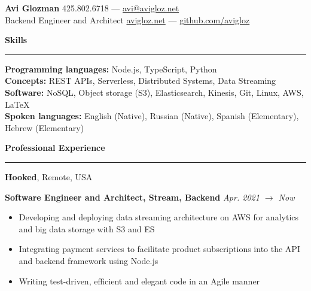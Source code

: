 \documentclass[10pt]{article}
\begin{document}
	\pagestyle{empty}
	\begin{center}
		{\huge \textbf{Avi Glozman}} {\large \hfill 425.802.6718 --- \href{mailto:avi@avigloz.net}{avi@avigloz.net}}\\
		{\large Backend Engineer and Architect \hfill \href{https://avigloz.net}{avigloz.net} --- \href{https://github.com/avigloz}{github.com/avigloz}}
	\end{center}
	
	\begin{flushleft}	
		\vspace{-0.5mm}
		{\large \raggedright \textbf{Skills}}
		\vspace{1.25mm}
	
		\hrule
	
		\vspace{2.25mm}
		\textbf{Programming languages:} Node.js, TypeScript, Python\\
		\vspace{0.5mm}
		\textbf{Concepts:} REST APIs, Serverless, Distributed Systems, Data Streaming\\
		\vspace{0.5mm}
		\textbf{Software:} NoSQL, Object storage (S3), Elasticsearch, Kinesis, Git, Linux, AWS, \LaTeX\\ 
		\vspace{0.5mm}
		\textbf{Spoken languages:} English (Native), Russian (Native), Spanish (Elementary),  Hebrew (Elementary)

		\vspace{1.5mm}
		{\large \raggedright \textbf{Professional Experience}}
		\vspace{1.25mm}
	
		\hrule

		\vspace{2.25mm}

		\textbf{Hooked}, Remote, USA\\
		\begin{leftli}
			{\small \textbf{Software Engineer and Architect, Stream, Backend}} \hfill \textit{\small Apr. 2021 $\rightarrow$ Now}
			\begin{itemize}
				\item Developing and deploying data streaming architecture on AWS for analytics and big data storage with S3 and ES
				\vspace{-2mm}
				\item Integrating payment services to facilitate product subscriptions into the API and backend framework using Node.js
				\vspace{-2mm}
				\item Writing test-driven, efficient and elegant code in an Agile manner
			\end{itemize}
		\end{leftli}


\end{flushleft}
\end{document}
